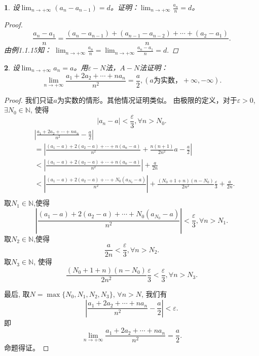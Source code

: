 \documentclass[utf8]{book}
\newtheorem{example}{}[section]             %
\begin{document}
\begin{example}
设$\displaystyle \lim_{n\to +\infty}(a_n - a_{n-1}) = d$。证明：$\displaystyle \lim_{n\to +\infty}\frac{a_n}{n} = d$。
\begin{proof}
$$\frac{a_n - a_1}{n} = \frac{(a_n - a_{n-1}) + (a_{n-1} - a_{n-2}) + \cdots + (a_2 - a_1)}{n}.$$
由例1.1.15知：
$\displaystyle \lim_{n\to +\infty}\frac{a_n}{n}=\displaystyle \lim_{n\to +\infty}\frac{a_n - a_1}{n} = d.$
\end{proof}
\end{example}
\begin{example}
设$\displaystyle \lim_{n\to +\infty}a_n = a$。用$\varepsilon-N$法，$A-N$法证明：
$$\displaystyle \lim_{n\to +\infty}\frac{a_1+2a_2+\cdots+na_n}{n^2} = \frac{a}{2}, (a \text{为实数}， +\infty, -\infty).$$
\end{example}
\begin{proof}
我们只证$a$为实数的情形。其他情况证明类似。
由极限的定义，对于$\varepsilon > 0$, $\exists N_0\in \mathbb{N}$, 使得$$\left|a_n - a\right| < \frac{\varepsilon}{3}, \forall n > N_0.$$
\begin{equation*}
\begin{split}
&\left | \frac{a_1+2a_2+\cdots+na_n}{n^2}  - \frac{a}{2} \right | \\&= \left | \frac{(a_1-a)+2(a_2-a)+\cdots+n(a_n-a)}{n^2} +\frac{n(n+1)}{2n^2}a - \frac{a}{2} \right |\\
 													 &< \left | \frac{(a_1-a)+2(a_2-a)+\cdots+n(a_n-a)}{n^2}\right | + \frac{a}{2n} \\
													 &<\left | \frac{(a_1-a)+2(a_2-a)+\cdots+N_0(a_{N_0}-a)}{n^2}\right | + \frac{(N_0+1+n)(n-N_0)}{2n^2}\frac{\varepsilon}{3} + \frac{a}{2n}.\\
	\end{split}
\end{equation*}
取$N_1 \in \mathbb{N}$,使得
$$\left | \frac{(a_1-a)+2(a_2-a)+\cdots+N_0(a_{N_0}-a)}{n^2}\right | <\frac{\varepsilon}{3}, \forall n > N_1.$$
取$N_2 \in \mathbb{N}$,使得
$$\frac{a}{2n} < \frac{\varepsilon}{3}, \forall n > N_2.$$
取$N_3\in \mathbb{N}$, 使得
$$\frac{(N_0+1+n)(n-N_0)}{2n^2}\frac{\varepsilon}{3} < \frac{\varepsilon}{3}, \forall n> N_3.$$

最后, 取$N = \max\{N_0, N_1, N_2, N_3\}$, $\forall n > N$, 我们有
$$\left | \frac{a_1+2a_2+\cdots+na_n}{n^2}  - \frac{a}{2} \right | < \varepsilon.$$
即$$\displaystyle \lim_{n\to +\infty}\frac{a_1+2a_2+\cdots+na_n}{n^2} = \frac{a}{2}.$$
命题得证。\end{proof}
\end{document}
